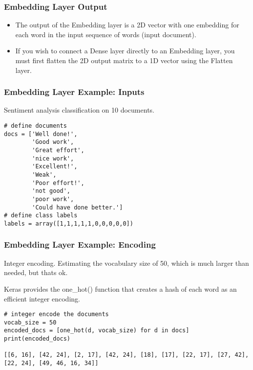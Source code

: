 \begin{frame}[fragile]\frametitle{Embedding Layer Output}

\begin{itemize}
\item The output of the Embedding layer is a 2D vector with one embedding for each word in the input sequence of words (input document).
\item If you wish to connect a Dense layer directly to an Embedding layer, you must first flatten the 2D output matrix to a 1D vector using the Flatten layer.
\end{itemize}

\end{frame}


\begin{frame}[fragile]\frametitle{Embedding Layer Example: Inputs}

Sentiment analysis classification on 10 documents.

\begin{lstlisting}
# define documents
docs = ['Well done!',
		'Good work',
		'Great effort',
		'nice work',
		'Excellent!',
		'Weak',
		'Poor effort!',
		'not good',
		'poor work',
		'Could have done better.']
# define class labels
labels = array([1,1,1,1,1,0,0,0,0,0])
\end{lstlisting}
\end{frame}


\begin{frame}[fragile]\frametitle{Embedding Layer Example: Encoding}

Integer encoding. Estimating the vocabulary size of 50, which is much larger than needed, but thats ok.

Keras provides the one\_hot() function that creates a hash of each word as an efficient integer encoding.

\begin{lstlisting}
# integer encode the documents
vocab_size = 50
encoded_docs = [one_hot(d, vocab_size) for d in docs]
print(encoded_docs)

[[6, 16], [42, 24], [2, 17], [42, 24], [18], [17], [22, 17], [27, 42], [22, 24], [49, 46, 16, 34]]
\end{lstlisting}
\end{frame}


